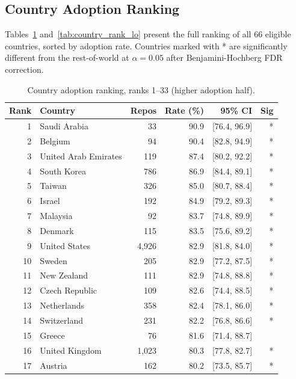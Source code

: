 \subsection{Country Adoption Ranking}

Tables~\ref{tab:country_rank_hi} and~\ref{tab:country_rank_lo} present the full ranking of all 66 eligible countries, sorted by adoption rate. Countries marked with * are significantly different from the rest-of-world at $\alpha = 0.05$ after Benjamini-Hochberg FDR correction.

\begin{table}[h]
\centering
\caption{Country adoption ranking, ranks 1--33 (higher adoption half).}
\label{tab:country_rank_hi}
\small
\begin{tabular}{@{}rlrrrr@{}}
\toprule
Rank & Country & Repos & Rate (\%) & 95\% CI & Sig \\
\midrule
 1 & Saudi Arabia        &    33 & 90.9 & [76.4, 96.9] & * \\
 2 & Belgium             &    94 & 90.4 & [82.8, 94.9] & * \\
 3 & United Arab Emirates &  119 & 87.4 & [80.2, 92.2] & * \\
 4 & South Korea         &   786 & 86.9 & [84.4, 89.1] & * \\
 5 & Taiwan              &   326 & 85.0 & [80.7, 88.4] & * \\
 6 & Israel              &   192 & 84.9 & [79.2, 89.3] & * \\
 7 & Malaysia            &    92 & 83.7 & [74.8, 89.9] & * \\
 8 & Denmark             &   115 & 83.5 & [75.6, 89.2] & * \\
 9 & United States       & 4,926 & 82.9 & [81.8, 84.0] & * \\
10 & Sweden              &   205 & 82.9 & [77.2, 87.5] & * \\
11 & New Zealand         &   111 & 82.9 & [74.8, 88.8] & * \\
12 & Czech Republic      &   109 & 82.6 & [74.4, 88.5] & * \\
13 & Netherlands         &   358 & 82.4 & [78.1, 86.0] & * \\
14 & Switzerland         &   231 & 82.2 & [76.8, 86.6] & * \\
15 & Greece              &    76 & 81.6 & [71.4, 88.7] &   \\
16 & United Kingdom      & 1,023 & 80.3 & [77.8, 82.7] & * \\
17 & Austria             &   162 & 80.2 & [73.5, 85.7] & * \\

\end{tabular}
\end{table}
